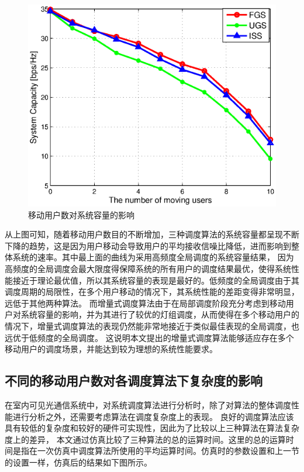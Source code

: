 \begin{figure}[htbp]
    \centering
	\includegraphics[width=\textwidth]{figures/chapter-5/MovingUserNum2Capacity.eps}
	\caption{移动用户数对系统容量的影响}
	\label{fig:moving-user-num-2-capacity}
\end{figure}

从上图可知，随着移动用户数目的不断增加，三种调度算法的系统容量都呈现不断下降的趋势，这是因为用户移动会导致用户的平均接收信噪比降低，进而影响到整体系统的速率。其中最上面的曲线为采用高频度全局调度的系统容量结果，
因为高频度的全局调度会最大限度得保障系统的所有用户的调度结果最优，使得系统性能接近于理论最优值，所以其系统容量的表现是最好的。低频度的全局调度由于其调度周期的局限性，在多个用户移动的情况下，其系统性能的差距变得非常明显，远低于其他两种算法。
而增量式调度算法由于在局部调度阶段充分考虑到移动用户对系统容量的影响，并为其进行了较优的灯组调度，从而使得在多个移动用户的情况下，增量式调度算法的表现仍然能非常地接近于类似最佳表现的全局调度，也远优于低频度的全局调度。
这说明本文提出的增量式调度算法能够适应存在多个移动用户的调度场景，并能达到较为理想的系统性能要求。

\subsection{不同的移动用户数对各调度算法下复杂度的影响}
在室内可见光通信系统中，对系统调度算法进行分析时，除了对算法的整体调度性能进行分析之外，还需要考虑算法在调度复杂度上的表现。
良好的调度算法应该具有较低的复杂度和较好的硬件可实现性，因此为了比较以上三种算法在算法复杂度上的差异，
本文通过仿真比较了三种算法的总的运算时间。这里的总的运算时间是指在一次仿真中调度算法所使用的平均运算时间。仿真时的参数设置和上一节的设置一样，仿真后的结果如下图所示。

